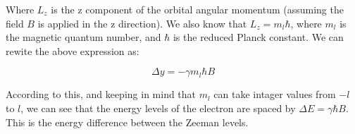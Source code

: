Where $L_z$ is the z component of the orbital angular momentum (assuming the field $B$ is applied in the z direction). We also know that
$L_z = m_l \hbar$, where $m_l$ is the magnetic quantum number, and $\hbar$ is the reduced Planck constant. We can rewite the above expression as:

\begin{equation}
    \Delta y = - \gamma m_l \hbar B
\end{equation}

According to this, and keeping in mind that $m_l$ can take intager values from $-l$ to $l$, we can see that the energy levels of the electron
are spaced by $\Delta E = \gamma \hbar B$. This is the energy difference between the Zeeman levels.